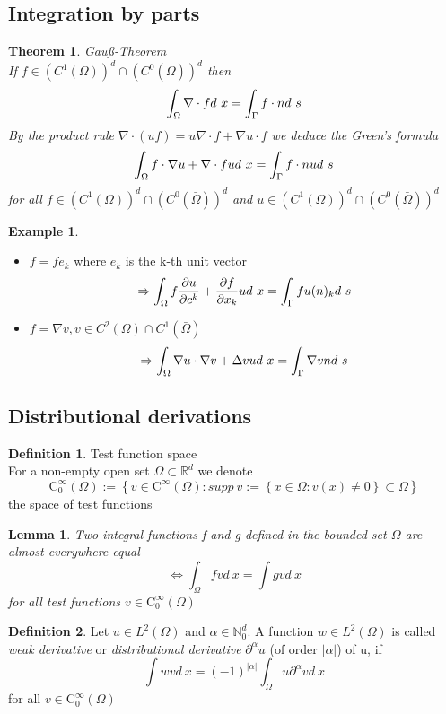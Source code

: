 \documentclass[english]{article}
\newtheorem*{theorem}{Theorem}
\newtheorem*{lemma}{Lemma}
\theoremstyle{definition}
\newtheorem*{defi}{Definition}
\newtheorem*{exa}{Example}
\theoremstyle{remark}
\newcommand{\f}[2]{\frac{#1}{#2}}							%
\newcommand{\p}{\partial}
\newcommand{\NN}{\mathbb{N}}			%
\newcommand{\RR}{\mathbb{R}}			%
\renewcommand{\aa}{\alpha}		%
\newcommand{\OO}{\Omega}
\newcommand{\cinf}{\tx{C}^\infty}
\newcommand{\drw}{\Rightarrow}			%
\newcommand{\gdw}{\Leftrightarrow}	%
\newcommand{\tri}{\nabla}
\newcommand{\tx}[1]{\text{#1}}
\begin{document}
\subsection{Integration by parts}
\begin{theorem} Gau\ss{}-Theorem\\
  If $f \in(C^1(\OO))^d\cap (C^0(\bar\OO))^d$ then 
  $$\int_\OO \tri \cdot f d\ x = \int_\GG f \cdot n d\ s$$
  By the product rule $\tri \cdot (u f )= u \tri \cdot f + \tri u \cdot f$ we deduce the Green's formula
  $$\int_\OO f \cdot \tri u + \tri \cdot f u d\ x = \int_\GG f \cdot n u d\ s$$
  for all $f \in(C^1(\OO))^d\cap (C^0(\bar\OO))^d$ and $u \in(C^1(\OO))^d\cap (C^0(\bar\OO))^d$
\end{theorem}
\begin{exa}
  \begin{itemize}
  \item $f=f e_k$ where $e_k$ is the k-th unit vector
    $$\drw \int_\OO f \f{\p u}{\p c^k}+ \f{\p f}{\p x_k} u d\ x = \int_\GG f u(n)_k d\ s$$
  \item $f = \nabla v, v \in C^2(\OO)\cap C^1(\bar\OO)$
    $$\drw \int_\OO \nabla u \cdot \nabla v + \Delta v u d\ x = \int_\GG \nabla v n d\ s$$
    
  \end{itemize}
\end{exa}
\subsection{Distributional derivations}
\begin{defi} Test function space\\
  For a non-empty open set $\OO \subset \RR^d$ we denote 
  $$\cinf_0 (\OO) := \left\{v \in \cinf(\OO) : supp\ v := \left\{x \in \OO: v(x)\neq 0 \right\} \subset \OO\right\}$$
  the space of test functions
\end{defi}
\begin{lemma}
  Two integral functions f and g defined in the bounded set $\OO$ are almost everywhere equal 
  $$\gdw \int_\OO f v d\ x = \int g v d\ x$$
  for all test functions $v \in \cinf_0(\OO	)$
\end{lemma}
\begin{defi}
  Let $u \in L^2(\OO)$ and $\aa \in \NN^d _0$. A function $w \in L^2(\OO)$ is called \emph{weak derivative}  or \emph{distributional derivative}  $\p^\aa u$ (of order $|\aa|$) of u, if 
  $$\int w v d\ x = (-1)^{|\aa|} \int _\OO u \p^\aa v d\ x$$
  for all $v \in \cinf_0(\OO)$

\end{defi}
\end{document}
